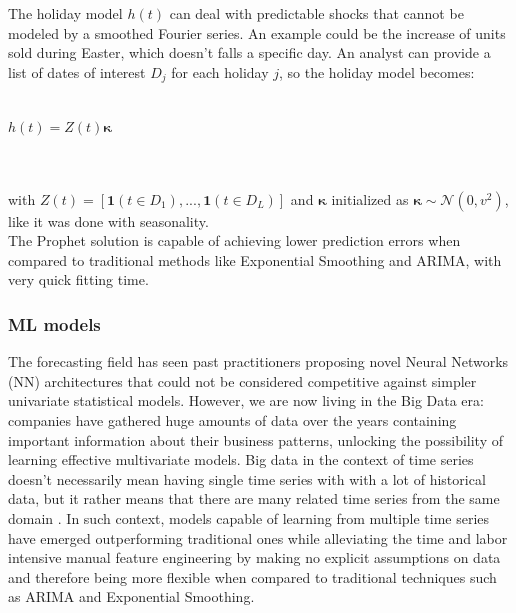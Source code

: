 \documentclass[a4paper]{article} %
\begin{document}
	The holiday model $h(t)$ can deal with predictable shocks that cannot be modeled by a smoothed Fourier series.  An example could be the increase of units sold during Easter, which doesn't falls a specific day. An analyst can provide a list of dates of interest $D_j$ for each holiday $j$, so the holiday model becomes:\\\\
	\centerline{$h(t) = Z(t) \pmb{\kappa}$}\\\\
	with $Z(t) = [ \mathbf{1} (t \in D_1), ..., \mathbf{1} (t \in D_L)] $ and $\pmb{\kappa}$ initialized as $\pmb{\kappa} \sim \mathcal{N}(0, v^2)$, like it was done with seasonality.\\
	The Prophet solution is capable of achieving lower prediction errors when compared to traditional methods like Exponential Smoothing and ARIMA, with very quick fitting time.
	
	\subsubsection{ML models}
	The forecasting field has seen past practitioners proposing novel Neural Networks (NN) architectures that could not be considered competitive against simpler univariate statistical models. However, we are now living in the Big Data era: companies have gathered huge amounts of data over the years containing important information about their business patterns, unlocking the possibility of learning effective multivariate models. Big data in the context of time series doesn't necessarily mean having single time series with with a lot of historical data, but it rather means that there are many related time series from the same domain \cite{RNNForecasting}. In such context, models capable of learning from multiple time series have emerged \cite{M5Competition} outperforming traditional ones while alleviating the time and labor intensive manual feature engineering by making no explicit assumptions on data and therefore being more flexible when compared to traditional techniques such as ARIMA and Exponential Smoothing.
	
\end{document}
